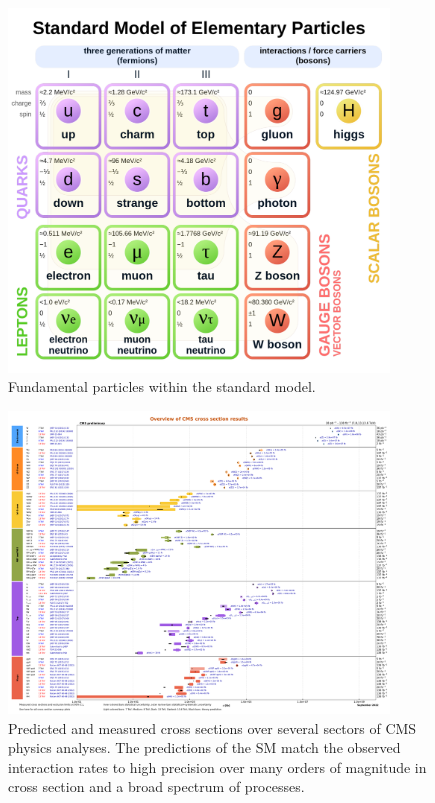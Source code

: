 \begin{figure}[htpb]
	\includegraphics[width=0.9\textwidth]{figures/smParticles.pdf}
	\centering
	\caption{Fundamental particles within the standard model.}
	\label{fig:SM}
\end{figure}

\begin{figure}[htpb]
	\includegraphics[width=0.9\textwidth]{figures/smRatePreds.pdf}
	\centering
	\caption[CMS Cross Section Results]{Predicted and measured cross sections over several sectors of CMS physics analyses. The predictions of the SM match the observed interaction rates to high precision over many orders of magnitude in cross section and a broad spectrum of processes.}
	\label{fig:SMratePreds}
\end{figure}

